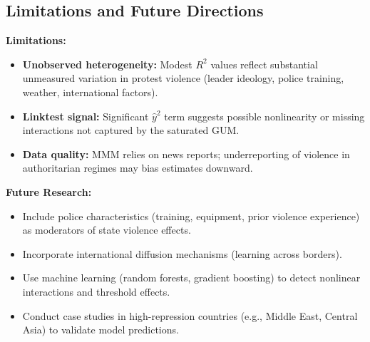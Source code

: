 \documentclass[11pt,a4paper]{article}
\begin{document}
\subsection{Limitations and Future Directions}

\textbf{Limitations:}
\begin{itemize}
    \item \textbf{Unobserved heterogeneity:} Modest $R^2$ values reflect substantial unmeasured variation in protest violence (leader ideology, police training, weather, international factors).
    
    \item \textbf{Linktest signal:} Significant $\hat{y}^2$ term suggests possible nonlinearity or missing interactions not captured by the saturated GUM.
    
    \item \textbf{Data quality:} MMM relies on news reports; underreporting of violence in authoritarian regimes may bias estimates downward.
\end{itemize}

\textbf{Future Research:}
\begin{itemize}
    \item Include police characteristics (training, equipment, prior violence experience) as moderators of state violence effects.
    \item Incorporate international diffusion mechanisms (learning across borders).
    \item Use machine learning (random forests, gradient boosting) to detect nonlinear interactions and threshold effects.
    \item Conduct case studies in high-repression countries (e.g., Middle East, Central Asia) to validate model predictions.
\end{itemize}
\end{document}
